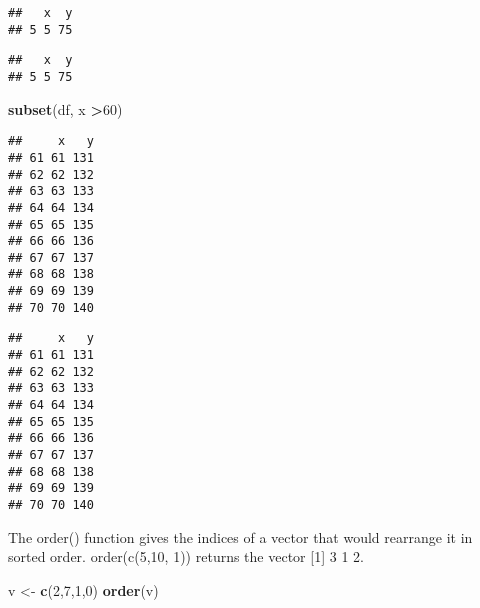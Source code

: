\documentclass[
]{article}
\newenvironment{Shaded}{\begin{snugshade}}{\end{snugshade}}
\newcommand{\DecValTok}[1]{\textcolor[rgb]{0.00,0.00,0.81}{#1}}
\newcommand{\KeywordTok}[1]{\textcolor[rgb]{0.13,0.29,0.53}{\textbf{#1}}}
\newcommand{\NormalTok}[1]{#1}
\newcommand{\OperatorTok}[1]{\textcolor[rgb]{0.81,0.36,0.00}{\textbf{#1}}}
\newcommand{\StringTok}[1]{\textcolor[rgb]{0.31,0.60,0.02}{#1}}
\begin{document}
\begin{verbatim}
##   x  y
## 5 5 75
\end{verbatim}

\begin{Shaded}
\end{Shaded}

\begin{verbatim}
##   x  y
## 5 5 75
\end{verbatim}

\begin{Shaded}
\begin{Highlighting}[]
\KeywordTok{subset}\NormalTok{(df, x }\OperatorTok{>}\DecValTok{60}\NormalTok{)}
\end{Highlighting}
\end{Shaded}

\begin{verbatim}
##     x   y
## 61 61 131
## 62 62 132
## 63 63 133
## 64 64 134
## 65 65 135
## 66 66 136
## 67 67 137
## 68 68 138
## 69 69 139
## 70 70 140
\end{verbatim}

\begin{Shaded}
\end{Shaded}

\begin{verbatim}
##     x   y
## 61 61 131
## 62 62 132
## 63 63 133
## 64 64 134
## 65 65 135
## 66 66 136
## 67 67 137
## 68 68 138
## 69 69 139
## 70 70 140
\end{verbatim}

The order() function gives the indices of a vector that would rearrange
it in sorted order. order(c(5,10, 1)) returns the vector {[}1{]} 3 1 2.

\begin{Shaded}
\begin{Highlighting}[]
\NormalTok{v <-}\StringTok{ }\KeywordTok{c}\NormalTok{(}\DecValTok{2}\NormalTok{,}\DecValTok{7}\NormalTok{,}\DecValTok{1}\NormalTok{,}\DecValTok{0}\NormalTok{)}
\KeywordTok{order}\NormalTok{(v)}
\end{Highlighting}
\end{Shaded}
\end{document}
